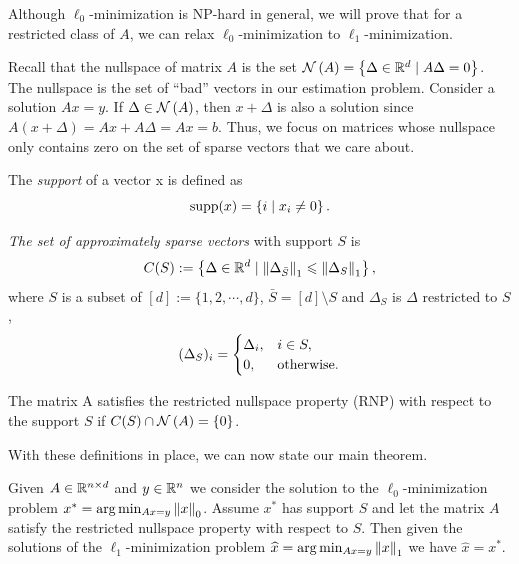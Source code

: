 \documentclass[11pt]{article}
\begin{document}
Although \(\ell_0\)-minimization is NP-hard in general, we will prove that for a restricted class of \(A\), we can relax \(\ell_0\)-minimization to \(\ell_1\)-minimization.

Recall that the nullspace of matrix \(A\) is the set \(\mathcal N\left(A\right)=\left\{\Delta \in\mathbb R^d \mid A \Delta=0\right\}\). The nullspace is the set of ``bad'' vectors in our estimation problem. Consider a solution \(A x=y\). If \(\Delta \in\mathcal N\left(A\right)\), then \(x+\Delta\) is also a solution since \(A(x+\Delta)=A x+A \Delta= A x=b\). Thus, we focus on matrices whose nullspace only contains zero on the set of sparse vectors that we care about.


\begin{definition}[Support]
    The \emph{support} of a vector x is defined as
    \[\operatorname{supp}(x) = \left\{i \mid x_i \neq 0\right\}.\]
\end{definition}

\begin{definition}
    \emph{The set of approximately sparse vectors} with support \(S\) is 
    \[C(S):=\left\{\Delta \in \mathbb R^d \mid \left\|\Delta_{\bar{S}}\right\|_1\leqslant \left\|\Delta_S\right\|_1\right\},\]
    where \(S\) is a subset of \([d]:=\{1,2,\cdots,d\}\), \(\bar{S}=[d]\setminus S\) and \(\Delta_S\) is \(\Delta\) restricted to \(S\),
    \[(\Delta_S)_i = \begin{cases}
        \Delta_i, & i \in S,\\
        0, & \textnormal{otherwise}.
    \end{cases}\]
\end{definition}

\begin{definition}
    The matrix A satisfies the restricted nullspace property (RNP) with respect to the support \(S\) if \(C(S) \cap \mathcal N\left(A\right)=\{0\}\).
\end{definition} 

With these definitions in place, we can now state our main theorem.

\begin{theorem}
    Given \(A \in \mathbb R^{n\times d}\) and \(y\in\mathbb R^n\) we consider the solution to the \(\ell_0\)-minimization problem \(x^*=\arg\min_{A x=y}\left\|x\right\|_{0}\). Assume \(x^*\) has support \(S\) and let the matrix \(A\) satisfy the restricted nullspace property with respect to \(S\). Then given the solutions of the \(\ell_1\)-minimization problem \(\widehat{x}=\arg\min_{A x=y}\left\|x\right\|_{1}\) we have \(\widehat{x}=x^*\).
\end{theorem}
\end{document}
